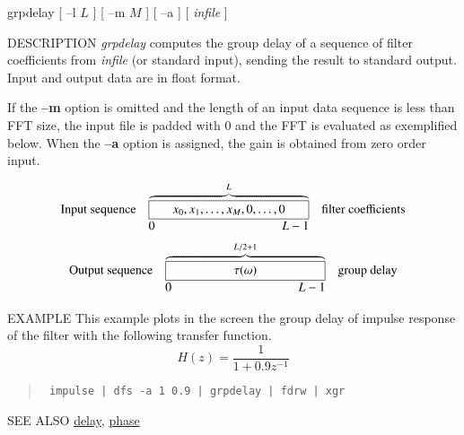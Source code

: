 %
\hypertarget{grpdelay}{}
\begin{synopsis}
 \item[grpdelay] [ --l $L$ ] [ --m $M$ ] [ --a ] [ {\em infile} ] 
\end{synopsis}

\begin{qsection}{DESCRIPTION}
{\em grpdelay} computes the group delay of a sequence of filter coefficients 
from {\em infile} (or standard input), 
sending the result to standard output.
Input and output data are in float format.
\par
If the {\bf --m} option is omitted
and the length of an input data sequence is less than FFT size,
the input file is padded with 0 and the FFT is evaluated
as exemplified below.
When the {\bf --a} option is assigned,
the gain is obtained from zero order input.
\par
\[
\begin{array}{lll}
\mbox{Input sequence} & 
\overbrace{\framebox[4.5cm]{$x_0, x_1, \ldots, x_{M}, 0,
					\ldots,0$}}^{L}  & \mbox{filter coefficients}\\
		& \makebox[4.5cm]{0\hfill $L-1$} &
\end{array}
\]
\[
\begin{array}{lll}
\mbox{Output sequence} & \overbrace{\framebox[4.5cm]{$\tau(\omega)$}}^{L/2+1} &
	   \mbox{group delay}\\
		& \makebox[4.5cm]{0\hfill $L-1$} &

\end{array}
\]
\end{qsection}

\begin{options}
\end{options}


\begin{qsection}{EXAMPLE}
This example plots in the screen the group delay of impulse response
of the filter with the following transfer function.
\begin{displaymath}
  H(z)=\frac{1}{1+0.9z^{-1}}
\end{displaymath}
\begin{quote}
\verb! impulse | dfs -a 1 0.9 | grpdelay | fdrw | xgr !
\end{quote}  
\end{qsection}

\begin{qsection}{SEE ALSO}
\hyperlink{delay}{delay},
\hyperlink{phase}{phase}
\end{qsection}
